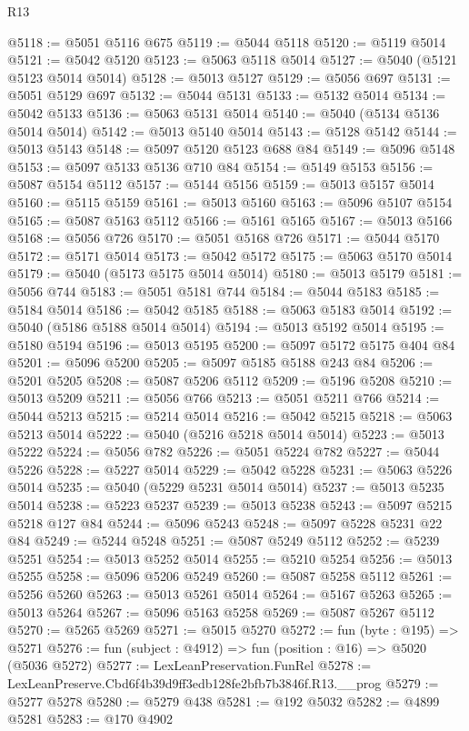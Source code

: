 \begin{lexlean}{R13}
\begin{coremodule}
@5118 := @5051 @5116 @675
@5119 := @5044 @5118
@5120 := @5119 @5014
@5121 := @5042 @5120
@5123 := @5063 @5118 @5014
@5127 := @5040 (@5121 @5123 @5014 @5014)
@5128 := @5013 @5127
@5129 := @5056 @697
@5131 := @5051 @5129 @697
@5132 := @5044 @5131
@5133 := @5132 @5014
@5134 := @5042 @5133
@5136 := @5063 @5131 @5014
@5140 := @5040 (@5134 @5136 @5014 @5014)
@5142 := @5013 @5140 @5014
@5143 := @5128 @5142
@5144 := @5013 @5143
@5148 := @5097 @5120 @5123 @688 @84
@5149 := @5096 @5148
@5153 := @5097 @5133 @5136 @710 @84
@5154 := @5149 @5153
@5156 := @5087 @5154 @5112
@5157 := @5144 @5156
@5159 := @5013 @5157 @5014
@5160 := @5115 @5159
@5161 := @5013 @5160
@5163 := @5096 @5107 @5154
@5165 := @5087 @5163 @5112
@5166 := @5161 @5165
@5167 := @5013 @5166
@5168 := @5056 @726
@5170 := @5051 @5168 @726
@5171 := @5044 @5170
@5172 := @5171 @5014
@5173 := @5042 @5172
@5175 := @5063 @5170 @5014
@5179 := @5040 (@5173 @5175 @5014 @5014)
@5180 := @5013 @5179
@5181 := @5056 @744
@5183 := @5051 @5181 @744
@5184 := @5044 @5183
@5185 := @5184 @5014
@5186 := @5042 @5185
@5188 := @5063 @5183 @5014
@5192 := @5040 (@5186 @5188 @5014 @5014)
@5194 := @5013 @5192 @5014
@5195 := @5180 @5194
@5196 := @5013 @5195
@5200 := @5097 @5172 @5175 @404 @84
@5201 := @5096 @5200
@5205 := @5097 @5185 @5188 @243 @84
@5206 := @5201 @5205
@5208 := @5087 @5206 @5112
@5209 := @5196 @5208
@5210 := @5013 @5209
@5211 := @5056 @766
@5213 := @5051 @5211 @766
@5214 := @5044 @5213
@5215 := @5214 @5014
@5216 := @5042 @5215
@5218 := @5063 @5213 @5014
@5222 := @5040 (@5216 @5218 @5014 @5014)
@5223 := @5013 @5222
@5224 := @5056 @782
@5226 := @5051 @5224 @782
@5227 := @5044 @5226
@5228 := @5227 @5014
@5229 := @5042 @5228
@5231 := @5063 @5226 @5014
@5235 := @5040 (@5229 @5231 @5014 @5014)
@5237 := @5013 @5235 @5014
@5238 := @5223 @5237
@5239 := @5013 @5238
@5243 := @5097 @5215 @5218 @127 @84
@5244 := @5096 @5243
@5248 := @5097 @5228 @5231 @22 @84
@5249 := @5244 @5248
@5251 := @5087 @5249 @5112
@5252 := @5239 @5251
@5254 := @5013 @5252 @5014
@5255 := @5210 @5254
@5256 := @5013 @5255
@5258 := @5096 @5206 @5249
@5260 := @5087 @5258 @5112
@5261 := @5256 @5260
@5263 := @5013 @5261 @5014
@5264 := @5167 @5263
@5265 := @5013 @5264
@5267 := @5096 @5163 @5258
@5269 := @5087 @5267 @5112
@5270 := @5265 @5269
@5271 := @5015 @5270
@5272 := fun (byte : @195) => @5271
@5276 := fun (subject : @4912) => fun (position : @16) => @5020 (@5036 @5272)
@5277 := LexLeanPreservation.FunRel
@5278 := LexLeanPreserve.Cbd6f4b39d9ff3edb128fe2bfb7b3846f.R13.__prog
@5279 := @5277 @5278
@5280 := @5279 @438
@5281 := @192 @5032
@5282 := @4899 @5281
@5283 := @170 @4902

\end{coremodule}
\end{lexlean}
